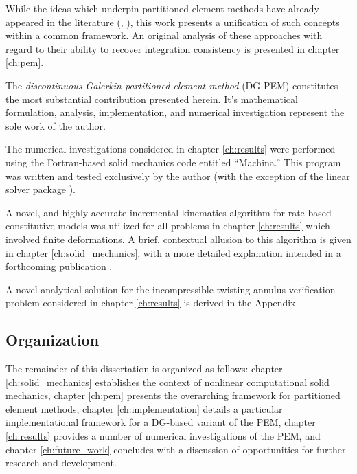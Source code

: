 	While the ideas which underpin partitioned element methods have already appeared in the literature (\cite{Rashid:12}, \cite{Bishop:14}), this work presents a unification of such concepts within a common framework. An original analysis of these approaches with regard to their ability to recover integration consistency is presented in chapter \ref{ch:pem}.
	
	The \textit{discontinuous Galerkin partitioned-element method} (DG-PEM) constitutes the most substantial contribution presented herein. It's mathematical formulation, analysis, implementation, and numerical investigation represent the sole work of the author.
	
	The numerical investigations considered in chapter \ref{ch:results} were performed using the Fortran-based solid mechanics code entitled ``Machina.'' This program was written and tested exclusively by the author (with the exception of the linear solver package \cite{Davis:04}).
	
	A novel, and highly accurate incremental kinematics algorithm for rate-based constitutive models was utilized for all problems in chapter \ref{ch:results} which involved finite deformations. A brief, contextual allusion to this algorithm is given in chapter \ref{ch:solid_mechanics}, with a more detailed explanation intended in a forthcoming publication \cite{kinematics_paper}.
	
	A novel analytical solution for the incompressible twisting annulus verification problem considered in chapter \ref{ch:results} is derived in the Appendix.

\subsection*{Organization}	

		
	The remainder of this dissertation is organized as follows: chapter \ref{ch:solid_mechanics} establishes the context of nonlinear computational solid mechanics, chapter \ref{ch:pem} presents the overarching framework for partitioned element methods, chapter \ref{ch:implementation} details a particular implementational framework for a DG-based variant of the PEM, chapter \ref{ch:results} provides a number of numerical investigations of the PEM, and chapter \ref{ch:future_work} concludes with a discussion of opportunities for further research and development.